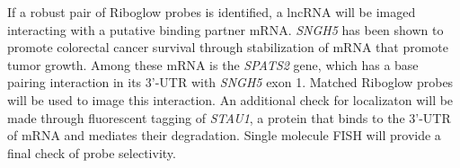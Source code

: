 If a robust pair of Riboglow probes is identified, a lncRNA will be imaged interacting with a putative binding partner mRNA. \textit{SNGH5} has been shown to promote colorectal cancer survival through stabilization of mRNA that promote tumor growth\cite{DamasSNHG5promotescolorectal2016}. Among these mRNA is the \textit{SPATS2} gene, which has a base pairing interaction in its 3'-UTR with \textit{SNGH5} exon 1. Matched Riboglow probes will be used to image this interaction. An additional check for localizaton will be made through fluorescent tagging of \textit{STAU1}, a protein that binds to the 3'-UTR of mRNA and mediates their degradation\cite{ParkEonyoungStaufenmediatedmRNA2013}. Single molecule FISH will provide a final check of probe selectivity.





